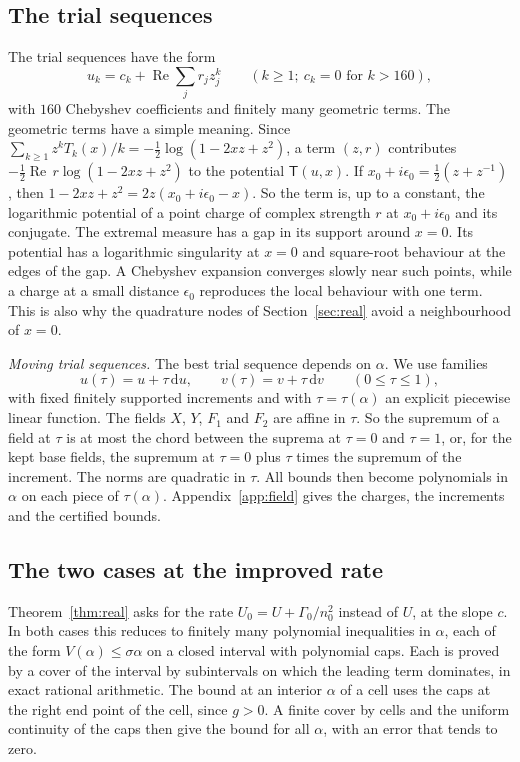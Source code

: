 \documentclass[11pt]{amsart}
\newcommand{\Kcoef}{160}
\theoremstyle{definition}
\theoremstyle{remark}
\numberwithin{equation}{section}
\begin{document}
\subsection{The trial sequences}\label{ssec:trials}
The trial sequences have the form
\begin{equation}\label{eq:trial}
 u_k=c_k+\operatorname{Re}\sum_jr_jz_j^k\qquad(k\ge1;\ c_k=0\text{ for }k>\Kcoef),
\end{equation}
with $\Kcoef$ Chebyshev coefficients and finitely many geometric terms. The geometric terms have a simple
meaning. Since $\sum_{k\ge1}z^kT_k(x)/k=-\frac12\log(1-2xz+z^2)$, a term $(z,r)$ contributes
$-\frac12\operatorname{Re}\,r\log(1-2xz+z^2)$ to the potential $\mathsf T(u,x)$. If
$x_0+i\epsilon_0=\frac12(z+z^{-1})$, then $1-2xz+z^2=2z(x_0+i\epsilon_0-x)$. So the term is, up to a constant,
the logarithmic potential of a point charge of complex strength $r$ at $x_0+i\epsilon_0$ and its conjugate. The
extremal measure has a gap in its support around $x=0$. Its potential has a logarithmic singularity at $x=0$
and square-root behaviour at the edges of the gap. A Chebyshev expansion converges slowly near such points,
while a charge at a small distance $\epsilon_0$ reproduces the local behaviour with one term. This is also why
the quadrature nodes of Section~\ref{sec:real} avoid a neighbourhood of $x=0$.

\emph{Moving trial sequences.} The best trial sequence depends on $\alpha$. We use families
\[
 u(\tau)=u+\tau\,\mathrm du,\qquad v(\tau)=v+\tau\,\mathrm dv\qquad(0\le\tau\le1),
\]
with fixed finitely supported increments and with $\tau=\tau(\alpha)$ an explicit piecewise linear function. The fields
$X$, $Y$, $F_1$ and $F_2$ are affine in $\tau$. So the supremum of a field at $\tau$ is at most the chord between the
suprema at $\tau=0$ and $\tau=1$, or, for the kept base fields, the supremum at $\tau=0$ plus $\tau$ times the supremum of the
increment. The norms are quadratic in $\tau$. All bounds then become polynomials in $\alpha$ on each piece of
$\tau(\alpha)$. Appendix~\ref{app:field} gives the charges, the increments and the certified bounds.

\subsection{The two cases at the improved rate}\label{ssec:cases}
Theorem~\ref{thm:real} asks for the rate $U_0=U+\Gamma_0/n_0^2$ instead of $U$, at the slope $c$. In both cases this
reduces to finitely many polynomial inequalities in $\alpha$, each of the form $V(\alpha)\le\sigma\alpha$ on a closed
interval with polynomial caps. Each is proved by a cover of the interval by subintervals on which the leading
term dominates, in exact rational arithmetic. The bound at an interior $\alpha$ of a cell uses the caps at the right
end point of the cell, since $g>0$. A finite cover by cells and the uniform continuity of the caps then give the
bound for all $\alpha$, with an error that tends to zero.
\end{document}
